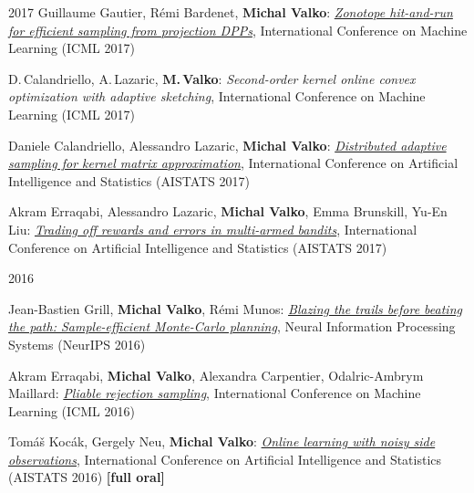 \documentclass{resume}
\begin{document}
\begin{category}{2017}
\citembullet
Guillaume Gautier, R\' emi Bardenet, {\bf Michal Valko}:
\href{http://researchers.lille.inria.fr/~valko/hp/serve.php?what=publications/gautier2017zonotope.pdf}
{\emph{Zonotope hit-and-run for efficient sampling from projection DPPs}},
International Conference on Machine Learning
({\sf ICML 2017}) 

\citembullet
D.\,Calandriello, A.\,Lazaric, {\bf M.\,Valko}:
\emph{Second-order kernel online convex optimization with adaptive sketching},
International Conference on Machine Learning
({\sf ICML 2017}) 

\citembullet
Daniele Calandriello, Alessandro Lazaric, {\bf Michal Valko}:
\href{http://researchers.lille.inria.fr/~valko/hp/serve.php?what=publications/calandriello2017distributed.pdf}
{\emph{Distributed adaptive sampling for kernel matrix approximation}},
International Conference on Artificial Intelligence and Statistics
({\sf AISTATS 2017}) 

\citembullet
Akram Erraqabi, Alessandro Lazaric, {\bf Michal Valko}, Emma Brunskill, Yu-En Liu:
\href{http://researchers.lille.inria.fr/~valko/hp/serve.php?what=publications/erraqabi2017trading.pdf}
{\emph{Trading off rewards and errors in multi-armed bandits}},
International Conference on Artificial Intelligence and Statistics
({\sf AISTATS 2017}) 

\end{category}\begin{category}{2016}

\citembullet
Jean-Bastien Grill, {\bf Michal Valko}, R\' emi Munos:
\href{http://researchers.lille.inria.fr/~valko/hp/serve.php?what=publications/grill2016blazing.pdf}
{\emph{Blazing the trails before beating the path: Sample-efficient Monte-Carlo planning}},
Neural Information Processing Systems
({\sf NeurIPS 2016}) 

\citembullet
Akram Erraqabi,  {\bf Michal Valko}, Alexandra Carpentier, Odalric-Ambrym Maillard:
\href{http://researchers.lille.inria.fr/~valko/hp/serve.php?what=publications/erraqabi2016pliable.pdf}
{\emph{Pliable rejection sampling}},
International Conference on Machine Learning
({\sf ICML 2016}) 

\citembullet
Tom\'a\v s Koc\' ak, Gergely Neu, {\bf Michal Valko}:
\href{http://researchers.lille.inria.fr/~valko/hp/serve.php?what=publications/kocak2016online.pdf}
{\emph{Online learning with noisy side observations}},
International Conference on Artificial Intelligence and Statistics
({\sf AISTATS 2016}) {\bf [full oral]}


\end{category}
\end{document}
